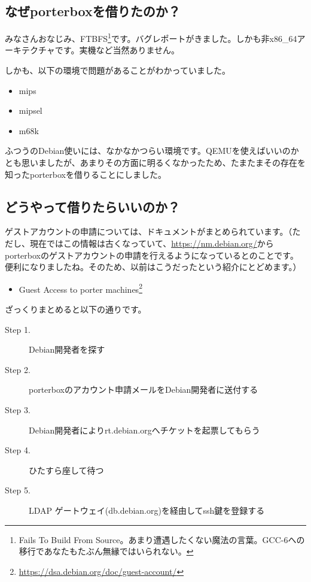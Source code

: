 \documentclass[mingoth,a4paper]{jsarticle}
\begin{document}
\subsection{なぜporterboxを借りたのか？}

みなさんおなじみ、FTBFS\footnote{Fails To Build From Source。あまり遭遇したくない魔法の言葉。GCC-6への移行であなたもたぶん無縁ではいられない。}です。バグレポートがきました。しかも非x86\_64アーキテクチャです。実機など当然ありません。

しかも、以下の環境で問題があることがわかっていました。

\begin{itemize}
\item mips
\item mipsel
\item m68k
\end{itemize}

ふつうのDebian使いには、なかなかつらい環境です。QEMUを使えばいいのかとも思いましたが、あまりその方面に明るくなかったため、たまたまその存在を知ったporterboxを借りることにしました。

\subsection{どうやって借りたらいいのか？}

ゲストアカウントの申請については、ドキュメントがまとめられています。（ただし、現在ではこの情報は古くなっていて、\url{https://nm.debian.org/}からporterboxのゲストアカウントの申請を行えるようになっているとのことです。便利になりましたね。そのため、以前はこうだったという紹介にとどめます。）

\begin{itemize}
\item Guest Access to porter machines\footnote{\url{https://dsa.debian.org/doc/guest-account/}}
\end{itemize}

ざっくりまとめると以下の通りです。

\begin{description}
\item [Step 1.] Debian開発者を探す
\item [Step 2.] porterboxのアカウント申請メールをDebian開発者に送付する
\item [Step 3.] Debian開発者によりrt.debian.orgへチケットを起票してもらう
\item [Step 4.] ひたすら座して待つ
\item [Step 5.] LDAP ゲートウェイ(db.debian.org)を経由してssh鍵を登録する
\end{description}
\end{document}
